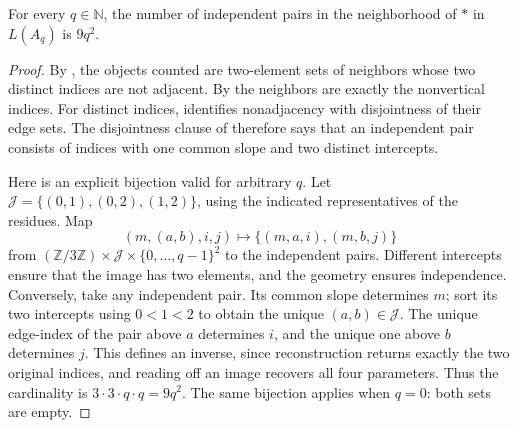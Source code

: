 \begin{lemma}
For every $q\in\mathbb N$, the number of independent pairs in the
neighborhood of $\ast$ in $L(A_q)$ is $9q^2$.
\end{lemma}
\begin{proof}
By , the objects counted are two-element
sets of neighbors whose two distinct indices are not adjacent.
By  the neighbors are exactly the
nonvertical indices. For distinct indices, 
identifies nonadjacency with disjointness of their edge sets. The disjointness
clause of  therefore says that an
independent pair consists of indices with one common slope and two distinct
intercepts.

Here is an explicit bijection valid for arbitrary $q$. Let
$\mathcal J=\{(0,1),(0,2),(1,2)\}$, using the indicated representatives of
the residues. Map
\[
(m,(a,b),i,j)\longmapsto\{(m,a,i),(m,b,j)\}
\]
from $(\mathbb Z/3\mathbb Z)\times\mathcal J\times
\{0,\ldots,q-1\}^2$ to the independent pairs. Different intercepts
ensure that the image has two elements, and the geometry ensures independence.
Conversely, take any independent pair. Its common slope determines $m$;
sort its two intercepts using $0<1<2$ to obtain the unique $(a,b)\in\mathcal J$.
The unique edge-index of the pair above $a$ determines $i$, and the unique
one above $b$ determines $j$. This defines an inverse, since reconstruction
returns exactly the two original indices, and reading off an image recovers
all four parameters. Thus the cardinality is
$3\cdot3\cdot q\cdot q=9q^2$. The same bijection applies when $q=0$:
both sets are empty.
\end{proof}

